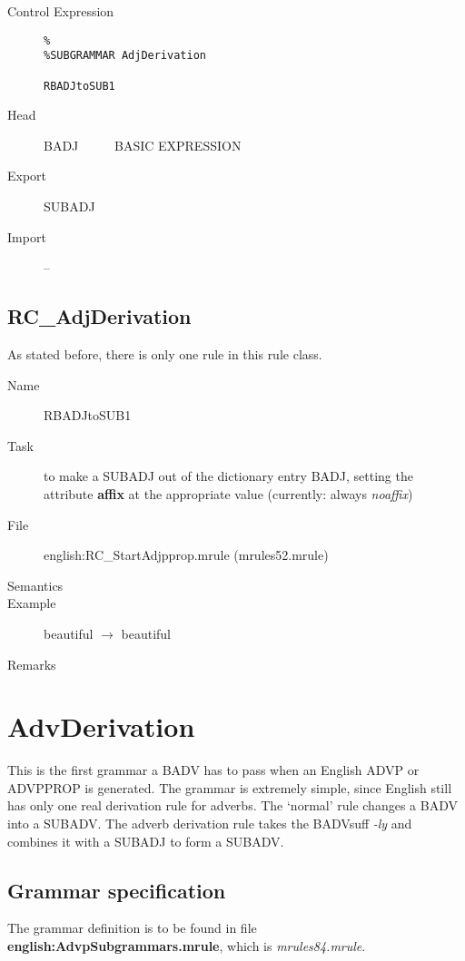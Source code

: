 \begin{description}
\item[Control Expression] \mbox{}
   \begin{verbatim}
%
%SUBGRAMMAR AdjDerivation

RBADJtoSUB1
   \end{verbatim}
\item[Head]    BADJ \ \ \ \ \   BASIC EXPRESSION 
\item[Export]  SUBADJ
\item[Import] --
\end{description}


\subsection{RC\_AdjDerivation}
As stated before, there is only one rule in this rule class.

\begin{description}
\item[Name] RBADJtoSUB1
\item[Task] to make a SUBADJ out of the dictionary entry BADJ, setting the 
attribute {\bf affix} at the appropriate value (currently: always {\em 
noaffix\/})
\item[File] english:RC\_StartAdjpprop.mrule (mrules52.mrule)
\item[Semantics]
\item[Example] beautiful $\rightarrow$ beautiful
\item[Remarks]
\end{description}

\newpage
\section{AdvDerivation}
This is the first grammar a BADV has to pass when an English ADVP or ADVPPROP
 is 
generated. The grammar is extremely simple, since English still has only one 
real derivation rule for adverbs. The `normal' rule changes a
BADV into a SUBADV. The adverb derivation rule takes the BADVsuff {\em -ly\/}
and combines it with a SUBADJ to form a SUBADV.

\subsection{Grammar specification}
The grammar definition is to be found in file {\bf 
english:AdvpSubgrammars.mrule}, which is {\em mrules84.mrule\/}.

